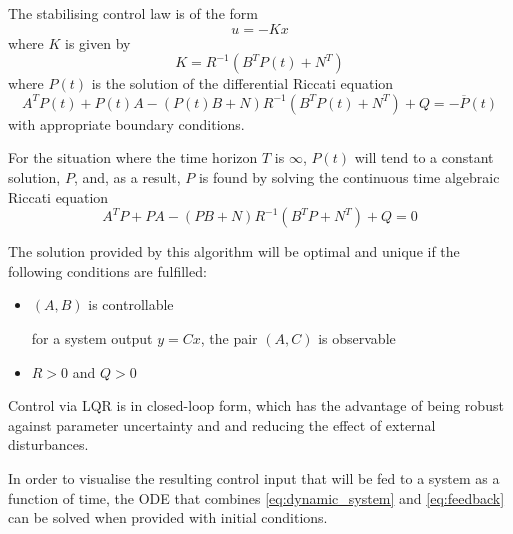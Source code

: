 \par The stabilising control law is of the form
\begin{equation}
    \label{eq:feedback}
    u = -Kx
\end{equation}
where $K$ is given by
\begin{equation}
    \label{eq:k_expression}
    K = R^{-1} (B^T P(t) + N^T)
\end{equation}
where $P(t)$ is the solution of the differential Riccati equation 
\begin{equation}
    \label{eq:p_diff_expression}
    A^T P(t) + P(t) A - (P(t) B + N) R^{-1} (B^T P(t) + N^T) + Q = - \overline{P}(t)
\end{equation}
with appropriate boundary conditions.

\par For the situation where the time horizon $T$ is $\infty$, $P(t)$ will tend to a constant solution, $P$, and, as a result, $P$ is found by solving the continuous time algebraic Riccati equation 
\begin{equation}
    \label{eq:p_expression}
    A^T P + PA - (PB + N) R^{-1} (B^T P + N^T) + Q = 0
\end{equation}


\par The solution provided by this algorithm will be optimal and unique if the following conditions are fulfilled:
\begin{itemize}
    \item $(A,B)$ is controllable
    \par for a system output $y = C x$, the pair $(A,C)$ is observable
    \item $R>0$ and $Q>0$
\end{itemize}


\par Control via LQR is in closed-loop form, which has the advantage of being robust against parameter uncertainty and and reducing the effect of external disturbances. 
\par In order to visualise the resulting control input that will be fed to a system as a function of time, the ODE that combines \ref{eq:dynamic_system}  and \ref{eq:feedback} can be solved when provided with initial conditions.

